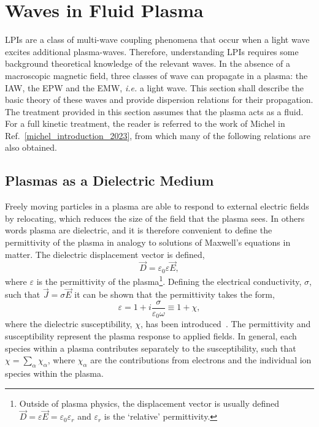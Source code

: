 \section{Waves in Fluid Plasma}%
\label{sec:theory_waves_plasmas}

\ac{LPIs} are a class of multi-wave coupling phenomena that occur when a light wave excites additional plasma-waves.
Therefore, understanding \ac{LPIs} requires some background theoretical knowledge of the relevant waves.
In the absence of a macroscopic magnetic field, three classes of wave can propagate in a plasma: the \ac{IAW}, the \ac{EPW} and the \ac{EMW}, \textit{i.e.} a light wave.
This section shall describe the basic theory of these waves and provide dispersion relations for their propagation.
The treatment provided in this section assumes that the plasma acts as a fluid.
For a full kinetic treatment, the reader is referred to the work of Michel in Ref.~\ref{michel_introduction_2023}, from which many of the following relations are also obtained.

\subsection{Plasmas as a Dielectric Medium}%
\label{sec:theory_dielectric}

Freely moving particles in a plasma are able to respond to external electric fields by relocating, which reduces the size of the field that the plasma sees.
In others words plasma are dielectric, and it is therefore convenient to define the permittivity of the plasma in analogy to solutions of Maxwell's equations in matter.
The dielectric displacement vector is defined,
\begin{equation}
    \vec{D} = \varepsilon_0 \varepsilon \vec{E},
\end{equation}
where $\varepsilon$ is the permittivity of the plasma\footnote{Outside of plasma physics, the displacement vector is usually defined $\vec{D} = \varepsilon\vec{E} = \varepsilon_0 \varepsilon_{r}$ and $\varepsilon_r$ is the `relative' permittivity.}.
Defining the electrical conductivity, $\sigma$, such that $\vec{J}=\sigma\vec{E}$ it can be shown that the permittivity takes the form,
\begin{equation}
    \label{eq:theory_perm_def}
    \varepsilon = 1 + i\frac{\sigma}{\varepsilon_0\omega} \equiv 1 + \chi,
\end{equation}
where the dielectric susceptibility, $\chi$, has been introduced~\cite{michel_introduction_2023}.
The permittivity and susceptibility represent the plasma response to applied fields.
In general, each species within a plasma contributes separately to the susceptibility, such that $\chi = \sum\nolimits_\alpha \chi_\alpha$, where $\chi_\alpha$ are the contributions from electrons and the individual ion species within the plasma.

